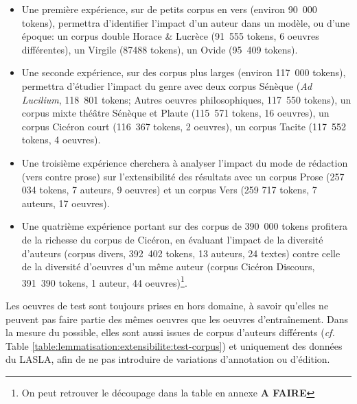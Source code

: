 \begin{itemize}
    \item Une première expérience, sur de petits corpus en vers (environ 90~000 tokens), permettra d'identifier l'impact d'un auteur dans un modèle, ou d'une époque: un corpus double Horace \& Lucrèce (91~555 tokens, 6 oeuvres différentes), un Virgile (87488 tokens), un Ovide (95~409 tokens).
    \item Une seconde expérience, sur des corpus plus larges (environ 117~000 tokens), permettra d'étudier l'impact du genre avec deux corpus Sénèque (\textit{Ad Lucilium}, 118~801 tokens; Autres oeuvres philosophiques, 117~550 tokens), un corpus mixte théâtre Sénèque et Plaute (115~571 tokens, 16 oeuvres), un corpus Cicéron court (116~367 tokens, 2 oeuvres), un corpus Tacite (117~552 tokens, 4 oeuvres).
    \item Une troisième expérience cherchera à analyser l'impact du mode de rédaction (vers contre prose) sur l'extensibilité des résultats avec un corpus Prose (257 034 tokens, 7 auteurs, 9 oeuvres) et un corpus Vers (259 717 tokens, 7 auteurs, 17 oeuvres).
    \item Une quatrième expérience portant sur des corpus de 390~000 tokens profitera de la richesse du corpus de Cicéron, en évaluant l'impact de la diversité d'auteurs (corpus divers, 392~402 tokens, 13 auteurs, 24 textes) contre celle de la diversité d'oeuvres d'un même auteur (corpus Cicéron Discours, 391~390 tokens, 1 auteur, 44 oeuvres)\footnote{On peut retrouver le découpage dans la table en annexe \textbf{A FAIRE}}.
\end{itemize}{}

Les oeuvres de test sont toujours prises en hors domaine, à savoir qu'elles ne peuvent pas faire partie des mêmes oeuvres que les oeuvres d'entraînement. Dans la mesure du possible, elles sont aussi issues de corpus d'auteurs différents (\textit{cf.} Table \ref{table:lemmatisation:extensibilite:test-corpus}) et uniquement des données du LASLA, afin de ne pas introduire de variations d'annotation ou d'édition.

